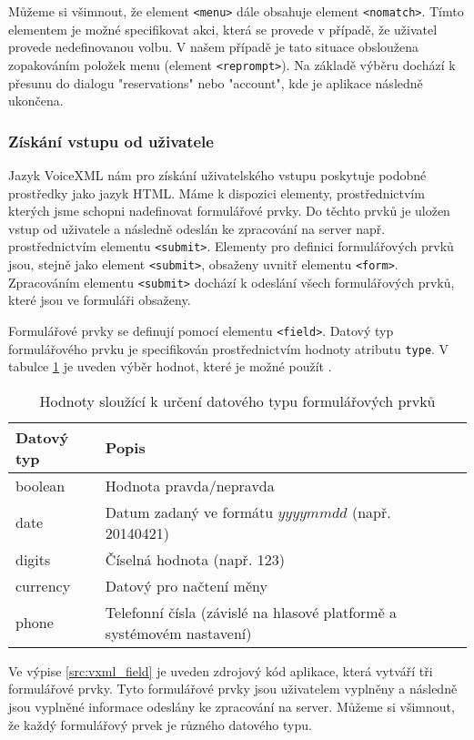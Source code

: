 \documentclass[ing,male,java,dept460,twoside]{diploma}						%
\begin{document}
Můžeme si všimnout, že element \texttt{<menu>} dále obsahuje element \texttt{<nomatch>}. Tímto elementem je možné specifikovat akci, která se provede v případě, že uživatel provede nedefinovanou volbu. V našem případě je tato situace obsloužena zopakováním položek menu (element \texttt{<reprompt>}). Na základě výběru dochází k přesunu do dialogu "reservations" nebo "account", kde je aplikace následně ukončena.

\subsubsection{Získání vstupu od uživatele}
\label{sec:VXML_input}
Jazyk VoiceXML nám pro získání uživatelského vstupu poskytuje podobné prostředky jako jazyk HTML. Máme k dispozici elementy, prostřednictvím kterých jsme schopni nadefinovat formulářové prvky. Do těchto prvků je uložen vstup od uživatele a následně odeslán ke zpracování na server např. prostřednictvím elementu \texttt{<submit>}. Elementy pro definici formulářových prvků jsou, stejně jako element \texttt{<submit>}, obsaženy uvnitř elementu \texttt{<form>}. Zpracováním elementu \texttt{<submit>} dochází k odeslání všech formulářových prvků, které jsou ve formuláři obsaženy.

Formulářové prvky se definují pomocí elementu \texttt{<field>}. Datový typ formulářového prvku je specifikován prostřednictvím hodnoty atributu \texttt{type}. V tabulce \ref{tab:form_fields_datatypes} je uveden výběr hodnot, které je možné použít \cite{vxml_org}.

\begin{table}
	\centering
	\begin{tabular}{|l|l|}
		\hline
		Datový typ & Popis \\
		\hline
		boolean & Hodnota pravda/nepravda  \\
		\hline
		date & Datum zadaný ve formátu $yyyymmdd$ (např. 20140421)   \\
		\hline
		digits & Číselná hodnota (např. 123)  \\
		\hline
		currency & Datový pro načtení měny  \\
		\hline
		phone & Telefonní čísla (závislé na hlasové platformě a systémovém nastavení)  \\
		\hline
	\end{tabular}
	\caption{Hodnoty sloužící k určení datového typu formulářových prvků}
	\label{tab:form_fields_datatypes}
\end{table}

Ve výpise \ref{src:vxml_field} je uveden zdrojový kód aplikace, která vytváří tři formulářové prvky. Tyto formulářové prvky jsou uživatelem vyplněny a následně jsou vyplněné informace odeslány ke zpracování na server. Můžeme si všimnout, že každý formulářový prvek je různého datového typu.
\end{document}
